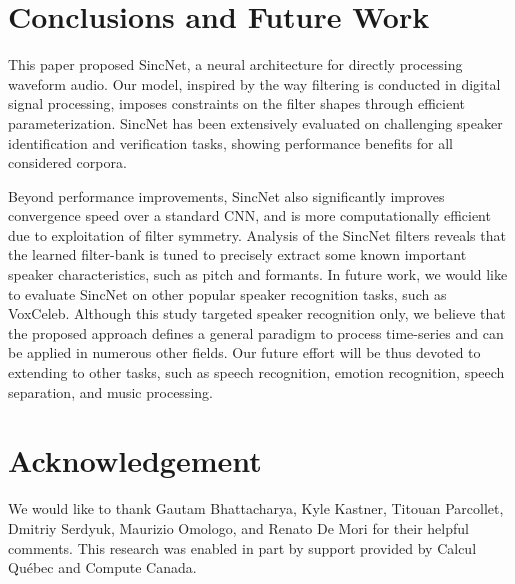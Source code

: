 \documentclass{article}
\begin{document}
\section{Conclusions and Future Work}
\label{sec:conc}
This paper proposed SincNet, a neural architecture for directly processing waveform audio. Our model, inspired by the way filtering is conducted in digital signal processing, imposes constraints on the filter shapes through efficient parameterization. SincNet has been extensively evaluated on challenging speaker identification and verification tasks, showing performance benefits for all considered corpora. 

Beyond performance improvements, SincNet also significantly improves convergence speed over a standard CNN, and is more computationally efficient due to exploitation of filter symmetry. Analysis of the SincNet filters reveals that the learned filter-bank is tuned to precisely extract some known important speaker characteristics, such as pitch and formants.
In future work, we would like to evaluate SincNet on other popular speaker recognition tasks, such as VoxCeleb. Although this study targeted speaker recognition only, we believe that the proposed approach defines a general paradigm to process time-series and can be applied in numerous other fields. Our future effort will be thus devoted to extending to other tasks, such as speech recognition, emotion recognition, speech separation, and music processing.


\section*{Acknowledgement}
We would like to thank Gautam Bhattacharya, Kyle Kastner, Titouan Parcollet, Dmitriy Serdyuk, Maurizio Omologo, and Renato De Mori for their helpful comments. This research was enabled in part by support provided by Calcul Qu\'ebec and Compute Canada.







\end{document}
